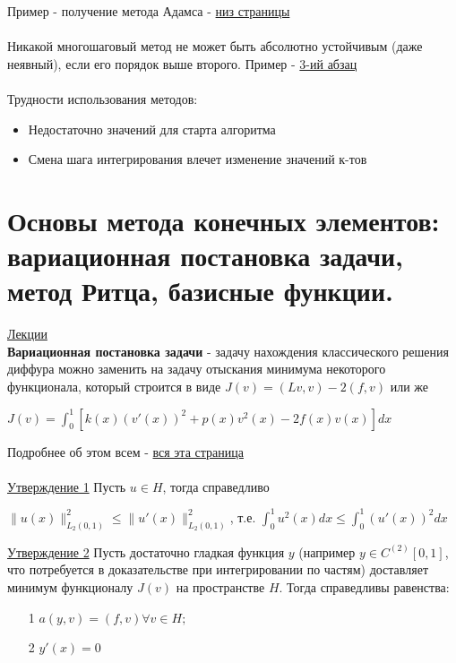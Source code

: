 \documentclass[specialist, subf, href, colorlinks=true, 12pt, times, mtpro, final]{disser}
\theoremstyle{definition}
\begin{document}
{    Пример - получение метода Адамса - \hyperlink {lects.92}{низ страницы}\\\\

    
    Никакой многошаговый метод не может быть абсолютно устойчивым (даже неявный), если его порядок выше второго. Пример - \hyperlink {lects.93}{3-ий абзац}\\
    \\
    Трудности использования методов: 
    \begin{itemize}
    \item Недостаточно значений для старта алгоритма
    \item Смена шага интегрирования влечет изменение значений к-тов
    \end{itemize}

\section {Основы метода конечных элементов: вариационная постановка задачи, метод Ритца, базисные функции.}
    \hyperlink {lects.97}{Лекции}\\
    
    \textbf{Вариационная постановка задачи} - задачу нахождения классического решения диффура можно заменить на задачу отыскания минимума некоторого функционала, который строится в виде $J(v) = (Lv,v) - 2(f,v)$ или же
    \begin{center}
    $J(v) = \int^1_0 [k(x)(v'(x))^2 + p(x)v^2(x) - 2f(x)v(x)]dx$
    \end{center}
    Подробнее об этом всем - \hyperlink {lects.97}{вся эта страница}\\
    \\
    \hyperlink {lects.98}{Утверждение 1} Пусть $u \in H$,  тогда справедливо
    \begin{center}
    $\|u(x)\|^2_{L_2(0,1)} \leq \|u'(x)\|^2_{L_2(0,1)}$, т.е. $\int^1_0 u^2(x)dx \leq \int^1_0 (u'(x))^2dx$
    \end{center}
    
   \hyperlink {lects.98}{Утверждение 2}
    Пусть достаточно гладкая функция
     $y$ (например $y \in C^{(2)}[0,1]$, что потребуется в доказательстве при интегрировании по частям) доставляет минимум функционалу $J(v)$ на пространстве $H$.  Тогда справедливы равенства:
    \begin{itemize}
    \item[1] $a(y,v) = (f,v) \forall v \in H;$
    \item[2]$y'(x) = 0$
    \end{itemize}
    
}
\end{document}
